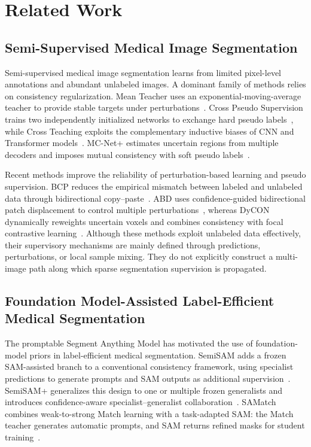 \documentclass[a4paper,fleqn]{cas-dc}
\begin{document}
\section{Related Work}

\subsection{Semi-Supervised Medical Image Segmentation}

Semi-supervised medical image segmentation learns from limited pixel-level annotations and abundant unlabeled images. A dominant family of methods relies on consistency regularization. Mean Teacher uses an exponential-moving-average teacher to provide stable targets under perturbations~\cite{tarvainen2017meanteacher}. Cross Pseudo Supervision trains two independently initialized networks to exchange hard pseudo labels~\cite{chen2021cps}, while Cross Teaching exploits the complementary inductive biases of CNN and Transformer models~\cite{luo2022crossteaching}. MC-Net+ estimates uncertain regions from multiple decoders and imposes mutual consistency with soft pseudo labels~\cite{wu2022mcnet}.

Recent methods improve the reliability of perturbation-based learning and pseudo supervision. BCP reduces the empirical mismatch between labeled and unlabeled data through bidirectional copy--paste~\cite{bai2023bcp}. ABD uses confidence-guided bidirectional patch displacement to control multiple perturbations~\cite{chi2024abd}, whereas DyCON dynamically reweights uncertain voxels and combines consistency with focal contrastive learning~\cite{assefa2025dycon}. Although these methods exploit unlabeled data effectively, their supervisory mechanisms are mainly defined through predictions, perturbations, or local sample mixing. They do not explicitly construct a multi-image path along which sparse segmentation supervision is propagated.

\subsection{Foundation Model-Assisted Label-Efficient Medical Segmentation}

The promptable Segment Anything Model has motivated the use of foundation-model priors in label-efficient medical segmentation. SemiSAM adds a frozen SAM-assisted branch to a conventional consistency framework, using specialist predictions to generate prompts and SAM outputs as additional supervision~\cite{zhang2023semisam}. SemiSAM+ generalizes this design to one or multiple frozen generalists and introduces confidence-aware specialist--generalist collaboration~\cite{zhang2025semisamplus}. SAMatch combines weak-to-strong Match learning with a task-adapted SAM: the Match teacher generates automatic prompts, and SAM returns refined masks for student training~\cite{xu2024samatch}.
\end{document}
